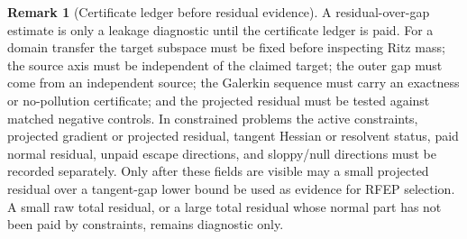 \documentclass[11pt,a4paper]{article}
\theoremstyle{plain}
\theoremstyle{definition}
\newtheorem{remark}[theorem]{Remark}
\begin{document}
\begin{remark}[Certificate ledger before residual evidence]
\label{rem:certificate-ledger}
A residual-over-gap estimate is only a leakage diagnostic until the
certificate ledger is paid.  For a domain transfer the target subspace
must be fixed before inspecting Ritz mass; the source axis must be
independent of the claimed target; the outer gap must come from an
independent source; the Galerkin sequence must carry an exactness or
no-pollution certificate; and the projected residual must be tested
against matched negative controls.  In constrained problems the active
constraints, projected gradient or projected residual, tangent Hessian
or resolvent status, paid normal residual, unpaid escape directions,
and sloppy/null directions must be recorded separately.  Only after
these fields are visible may a small projected residual over a
tangent-gap lower bound be used as evidence for RFEP selection.  A
small raw total residual, or a large total residual whose normal part
has not been paid by constraints, remains diagnostic only.
\end{remark}
\end{document}
